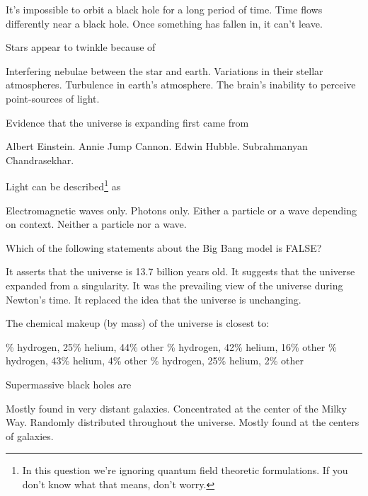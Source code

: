 \documentclass{exam}
\begin{document}
\begin{multicols*}{2}
\begin{questions}
\begin{choices}
		\CorrectChoice It's impossible to orbit a black hole for a long period of time.
		\choice Time flows differently near a black hole.
		\choice Once something has fallen in, it can’t leave.
	\end{choices}
	\question Stars appear to twinkle because of
	\begin{choices}
		\choice Interfering nebulae between the star and earth.
		\choice Variations in their stellar atmospheres.
		\CorrectChoice Turbulence in earth’s atmosphere.
		\choice The brain’s inability to perceive point-sources of light.
	\end{choices}
	\question Evidence that the universe is expanding first came from
	\begin{choices}
		\choice Albert Einstein.
		\choice Annie Jump Cannon.
		\CorrectChoice Edwin Hubble.
		\choice Subrahmanyan Chandrasekhar.
	\end{choices}
	\question Light can be described\footnote{In this question we're ignoring quantum field theoretic formulations. If you don't know what that means, don't worry.} as
	\begin{choices}
		\choice Electromagnetic waves only.
		\choice Photons only.
		\CorrectChoice Either a particle or a wave depending on context.
		\choice Neither a particle nor a wave.
	\end{choices}
	\vfill\null\columnbreak
	\question Which of the following statements about the Big Bang model is FALSE?
	\begin{choices}
		\choice It asserts that the universe is 13.7 billion years old.
		\choice It suggests that the universe expanded from a singularity.
		\CorrectChoice It was the prevailing view of the universe during Newton’s time.
		\choice It replaced the idea that the universe is unchanging.
	\end{choices}
	\question The chemical makeup (by mass) of the universe is closest to:
	\begin{choices}
		\% hydrogen, 25\% helium, 44\% other
		\% hydrogen, 42\% helium, 16\% other
		\% hydrogen, 43\% helium, 4\% other
		\% hydrogen, 25\% helium, 2\% other
	\end{choices}
	\question Supermassive black holes are
	\begin{choices}
		\choice Mostly found in very distant galaxies.
		\choice Concentrated at the center of the Milky Way.
		\choice Randomly distributed throughout the universe.
		\CorrectChoice Mostly found at the centers of galaxies.
	\end{choices}

\end{questions}
\end{multicols*}
\end{document}
